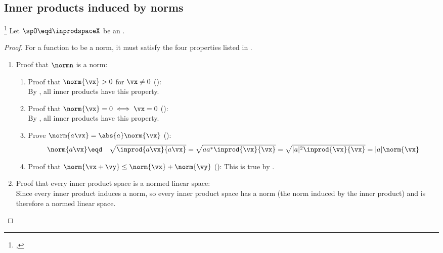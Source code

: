 \subsection{Inner products induced by norms}
\begin{theorem}
\footnote{
  ,
  }
\label{thm:norm=inprod}
\label{thm:inducednorm}
Let $\spO\eqd\inprodspaceX$ be an  .
\end{theorem}
\begin{proof}
For a function to be a norm, it must satisfy the four properties listed in
.
\begin{enumerate}
  \item Proof that $\normn$ is a norm:
\begin{enumerate}
  \item Proof that $\norm{\vx}>0$ for $\vx\ne 0$ (): \\
    By , all inner products have this property.

  \item Proof that $\norm{\vx}=0 \iff \vx=0$ (): \\
    By , all inner products have this property.

  \item Prove $\norm{a\vx}=\abs{a}\norm{\vx}$ ():
  \begin{eqnarray*}
    \norm{a\vx}
      &\eqd& \sqrt{\inprod{a\vx}{a\vx}}
      = \sqrt{a a^\ast \inprod{\vx}{\vx}}
      = \sqrt{|a|^2 \inprod{\vx}{\vx}}
      = |a| \norm{\vx}
  \end{eqnarray*}

  \item Proof that $\norm{\vx+\vy}\le\norm{\vx}+\norm{\vy}$ ():
        This is true by .
\end{enumerate}

  \item Proof that every inner product space is a normed linear space:\\
    Since every inner product induces a norm, so every inner product space
    has a norm (the norm induced by the inner product)
    and is therefore a normed linear space.
\end{enumerate}
\end{proof}

